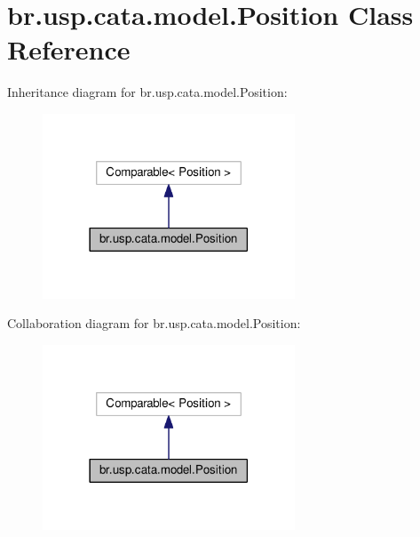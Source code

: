 \hypertarget{classbr_1_1usp_1_1cata_1_1model_1_1_position}{\section{br.\+usp.\+cata.\+model.\+Position Class Reference}
\label{classbr_1_1usp_1_1cata_1_1model_1_1_position}
}


Inheritance diagram for br.\+usp.\+cata.\+model.\+Position\+:\nopagebreak
\begin{figure}[H]
\begin{center}
\leavevmode
\includegraphics[width=213pt]{classbr_1_1usp_1_1cata_1_1model_1_1_position__inherit__graph}
\end{center}
\end{figure}


Collaboration diagram for br.\+usp.\+cata.\+model.\+Position\+:\nopagebreak
\begin{figure}[H]
\begin{center}
\leavevmode
\includegraphics[width=213pt]{classbr_1_1usp_1_1cata_1_1model_1_1_position__coll__graph}
\end{center}
\end{figure}
